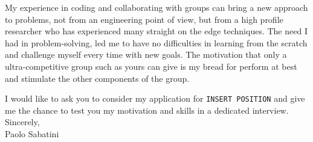 \documentclass[12pt,a4paper]{article}
\begin{document}
{\begin{small}
My experience in coding and collaborating with groups can bring a new approach to problems, not from an engineering point of view, but from a high profile researcher who has experienced many straight on the edge techniques. The need I had in problem-solving, led me to have no difficulties in learning from the scratch and challenge myself every time with new goals. The motivation that only a ultra-competitive group such as yours can give is my bread for perform at best and stimulate the other components of the group.\par

I would like to ask you to consider my application for \texttt{\color{red!80!black}INSERT POSITION} and give me the chance to test you my motivation and skills in a dedicated interview.\\[2mm]

Sincerely,\\[0.5mm]
\tabto{0.5cm} Paolo Sabatini


\end{small}


}
\end{document}
